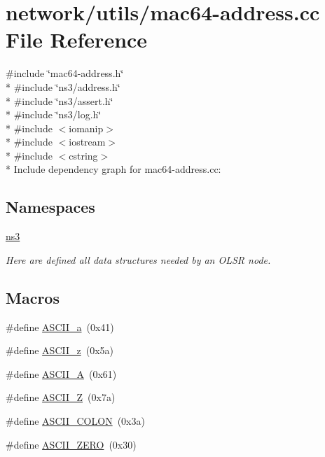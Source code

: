 \hypertarget{mac64-address_8cc}{}\section{network/utils/mac64-\/address.cc File Reference}
\label{mac64-address_8cc}
{\ttfamily \#include \char`\"{}mac64-\/address.\+h\char`\"{}}\\*
{\ttfamily \#include \char`\"{}ns3/address.\+h\char`\"{}}\\*
{\ttfamily \#include \char`\"{}ns3/assert.\+h\char`\"{}}\\*
{\ttfamily \#include \char`\"{}ns3/log.\+h\char`\"{}}\\*
{\ttfamily \#include $<$iomanip$>$}\\*
{\ttfamily \#include $<$iostream$>$}\\*
{\ttfamily \#include $<$cstring$>$}\\*
Include dependency graph for mac64-\/address.cc\+:
\subsection*{Namespaces}
\begin{DoxyCompactItemize}
\item 
 \hyperlink{namespacens3}{ns3}
\begin{DoxyCompactList}\small\item\em Here are defined all data structures needed by an O\+L\+SR node. \end{DoxyCompactList}\end{DoxyCompactItemize}
\subsection*{Macros}
\begin{DoxyCompactItemize}
\item 
\#define \hyperlink{mac64-address_8cc_acb0c7653dabe53da8a7fb03bcad505e7}{A\+S\+C\+I\+I\+\_\+a}~(0x41)
\item 
\#define \hyperlink{mac64-address_8cc_a76cb409bf2d31112b1bec0056271e3ce}{A\+S\+C\+I\+I\+\_\+z}~(0x5a)
\item 
\#define \hyperlink{mac64-address_8cc_a6ccdee41712ed103021e82cb944f47e6}{A\+S\+C\+I\+I\+\_\+A}~(0x61)
\item 
\#define \hyperlink{mac64-address_8cc_a282e9a9765b0ae5f0a4aa813c3a4932c}{A\+S\+C\+I\+I\+\_\+Z}~(0x7a)
\item 
\#define \hyperlink{mac64-address_8cc_aa13140b716dfb153353b2bf8be77d3f5}{A\+S\+C\+I\+I\+\_\+\+C\+O\+L\+ON}~(0x3a)
\item 
\#define \hyperlink{mac64-address_8cc_abde11a6ee98560227d0d3889da0408e4}{A\+S\+C\+I\+I\+\_\+\+Z\+E\+RO}~(0x30)
\end{DoxyCompactItemize}
